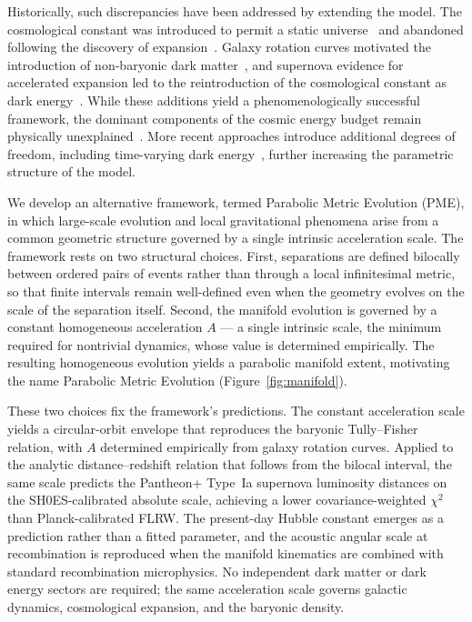\documentclass[fontsize=12pt, paper=a4]{scrartcl}
\begin{document}
Historically, such discrepancies have been addressed by extending the model. The cosmological constant was introduced to permit a static universe~\cite{Einstein1917} and abandoned following the discovery of expansion~\cite{Hubble1929}. Galaxy rotation curves motivated the introduction of non-baryonic dark matter~\cite{Rubin1980}, and supernova evidence for accelerated expansion led to the reintroduction of the cosmological constant as dark energy~\cite{Riess1998,Perlmutter1999}. While these additions yield a phenomenologically successful framework, the dominant components of the cosmic energy budget remain physically unexplained~\cite{Planck2018}. More recent approaches introduce additional degrees of freedom, including time-varying dark energy~\cite{DiValentino2021}, further increasing the parametric structure of the model.

We develop an alternative framework, termed Parabolic Metric Evolution (PME), in which large-scale evolution and local gravitational phenomena arise from a common geometric structure governed by a single intrinsic acceleration scale. The framework rests on two structural choices. First, separations are defined bilocally between ordered pairs of events rather than through a local infinitesimal metric, so that finite intervals remain well-defined even when the geometry evolves on the scale of the separation itself. Second, the manifold evolution is governed by a constant homogeneous acceleration $A$ --- a single intrinsic scale, the minimum required for nontrivial dynamics, whose value is determined empirically. The resulting homogeneous evolution yields a parabolic manifold extent, motivating the name Parabolic Metric Evolution (Figure~\ref{fig:manifold}).

These two choices fix the framework's predictions. The constant acceleration scale yields a circular-orbit envelope that reproduces the baryonic Tully--Fisher relation, with $A$ determined empirically from galaxy rotation curves. Applied to the analytic distance--redshift relation that follows from the bilocal interval, the same scale predicts the Pantheon+ Type~Ia supernova luminosity distances on the SH0ES-calibrated absolute scale, achieving a lower covariance-weighted $\chi^2$ than Planck-calibrated FLRW. The present-day Hubble constant emerges as a prediction rather than a fitted parameter, and the acoustic angular scale at recombination is reproduced when the manifold kinematics are combined with standard recombination microphysics. No independent dark matter or dark energy sectors are required; the same acceleration scale governs galactic dynamics, cosmological expansion, and the baryonic density.
\end{document}
